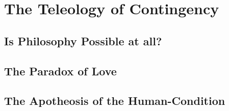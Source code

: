 \chapter{The Teleology of Contingency}

\section{Is Philosophy Possible at all?}

\section{The Paradox of Love}

\section{The Apotheosis of the Human-Condition}